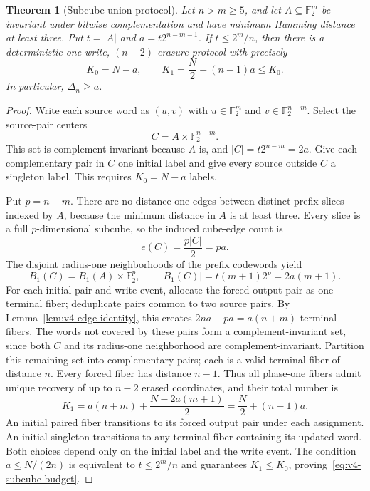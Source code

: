 \documentclass[11pt,a4paper]{article}
\newtheorem{theorem}{Theorem}[section]
\begin{document}
\begin{theorem}[Subcube-union protocol]\label{thm:v4-subcube}
Let $n>m\ge5$, and let $A\subseteq\mathbb F_2^m$ be invariant under bitwise complementation and have minimum Hamming distance at least three. Put $t=|A|$ and $a=t2^{n-m-1}$. If $t\le2^m/n$, then there is a deterministic one-write, $(n-2)$-erasure protocol with precisely
\begin{equation}\label{eq:v4-subcube-budget}
 \boxed{\quad K_0=N-a,\qquad
 K_1=\frac N2+(n-1)a\le K_0.\quad}
\end{equation}
In particular, $\Delta_n\ge a$.
\end{theorem}
\begin{proof}
Write each source word as $(u,v)$ with $u\in\mathbb F_2^m$ and $v\in\mathbb F_2^{n-m}$. Select the source-pair centers
\[
 C=A\times\mathbb F_2^{n-m}.
\]
This set is complement-invariant because $A$ is, and $|C|=t2^{n-m}=2a$. Give each complementary pair in $C$ one initial label and give every source outside $C$ a singleton label. This requires $K_0=N-a$ labels.

Put $p=n-m$. There are no distance-one edges between distinct prefix slices indexed by $A$, because the minimum distance in $A$ is at least three. Every slice is a full $p$-dimensional subcube, so the induced cube-edge count is
\[
 e(C)=\frac{p|C|}{2}=pa.
\]
The disjoint radius-one neighborhoods of the prefix codewords yield
\[
 B_1(C)=B_1(A)\times\mathbb F_2^p,\qquad
 |B_1(C)|=t(m+1)2^p=2a(m+1).
\]
For each initial pair and write event, allocate the forced output pair as one terminal fiber; deduplicate pairs common to two source pairs. By Lemma~\ref{lem:v4-edge-identity}, this creates $2na-pa=a(n+m)$ terminal fibers. The words not covered by these pairs form a complement-invariant set, since both $C$ and its radius-one neighborhood are complement-invariant. Partition this remaining set into complementary pairs; each is a valid terminal fiber of distance $n$. Every forced fiber has distance $n-1$. Thus all phase-one fibers admit unique recovery of up to $n-2$ erased coordinates, and their total number is
\[
 K_1=a(n+m)+\frac{N-2a(m+1)}2
    =\frac N2+(n-1)a.
\]
An initial paired fiber transitions to its forced output pair under each assignment. An initial singleton transitions to any terminal fiber containing its updated word. Both choices depend only on the initial label and the write event. The condition $a\le N/(2n)$ is equivalent to $t\le2^m/n$ and guarantees $K_1\le K_0$, proving~\eqref{eq:v4-subcube-budget}.
\end{proof}
\end{document}

